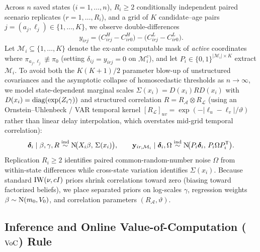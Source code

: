 Across $n$ saved states ($i=1,\dots,n$), $R_i \ge 2$ conditionally independent paired scenario replicates ($r=1,\dots,R_i$), and a grid of $K$ candidate--age pairs $j = (a_j, \ell_j) \in \{1,\dots,K\}$, we observe double-differences
\begin{equation}\label{eq:double-diff}
y_{irj} = \big(C^H_{irj} - C^H_{ir0}\big) - \big(C^L_{irj} - C^L_{ir0}\big).
\end{equation}
Let $\mathcal{M}_i \subseteq \{1,\dots,K\}$ denote the ex-ante computable mask of \emph{active} coordinates where $\pi_{a_j,\ell_j} \not\equiv \pi_0$ (setting $\delta_{ij} = y_{irj} = 0$ on $\mathcal{M}_i^c$), and let $P_i \in \{0,1\}^{|\mathcal{M}_i| \times K}$ extract $\mathcal{M}_i$. To avoid both the $K(K+1)/2$ parameter blow-up of unstructured covariances and the asymptotic collapse of homoscedastic thresholds as $n \to \infty$, we model state-dependent marginal scales $\Sigma(x_i) = D(x_i) R D(x_i)$ with $D(x_i) = \operatorname{diag}(\exp(Z_i \gamma))$ and structured correlation $R = R_{\mathcal{A}} \otimes R_{\mathcal{L}}$ (using an Ornstein--Uhlenbeck / VAR temporal kernel $[R_{\mathcal{L}}]_{uv} = \exp(-|\ell_u - \ell_v|/\vartheta)$ rather than linear delay interpolation, which overstates mid-grid temporal correlation):
\begin{equation}\label{eq:hier-model}
\boldsymbol\delta_i \mid \beta, \gamma, R \stackrel{\mathrm{ind}}{\sim} \mathrm{N}\!\big(X_i\beta,\, \Sigma(x_i)\big),
\qquad
\mathbf{y}_{ir,\mathcal{M}_i} \mid \boldsymbol\delta_i, \Omega \stackrel{\mathrm{ind}}{\sim} \mathrm{N}\!\big(P_i \boldsymbol\delta_i,\, P_i \Omega P_i^{\mathsf T}\big).
\end{equation}
Replication $R_i \ge 2$ identifies paired common-random-number noise $\Omega$ from within-state differences while cross-state variation identifies $\Sigma(x_i)$. Because standard $\operatorname{IW}(\nu, cI)$ priors shrink correlations toward zero (biasing toward factorized beliefs), we place separated priors on log-scales $\gamma$, regression weights $\beta \sim \mathrm{N}(m_0, V_0)$, and correlation parameters $(R_{\mathcal{A}}, \vartheta)$.

\subsection{Inference and Online Value-of-Computation ($\operatorname{VoC}$) Rule}

